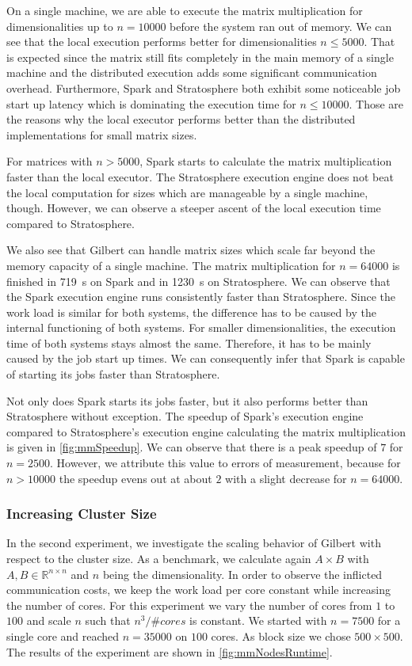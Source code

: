On a single machine, we are able to execute the matrix multiplication for dimensionalities up to $n=10000$ before the system ran out of memory.
We can see that the local execution performs better for dimensionalities $n \le 5000$.
That is expected since the matrix still fits completely in the main memory of a single machine and the distributed execution adds some significant communication overhead.
Furthermore, Spark and Stratosphere both exhibit some noticeable job start up latency which is dominating the execution time for $n\le 10000$.
Those are the reasons why the local executor performs better than the distributed implementations for small matrix sizes.

For matrices with $n>5000$, Spark starts to calculate the matrix multiplication faster than the local executor.
The Stratosphere execution engine does not beat the local computation for sizes which are manageable by a single machine, though.
However, we can observe a steeper ascent of the local execution time compared to Stratosphere.

We also see that Gilbert can handle matrix sizes which scale far beyond the memory capacity of a single machine.
The matrix multiplication for $n=64000$ is finished in \SI{719}{\second} on Spark and in \SI{1230}{\second} on Stratosphere.
We can observe that the Spark execution engine runs consistently faster than Stratosphere.
Since the work load is similar for both systems, the difference has to be caused by the internal functioning of both systems.
For smaller dimensionalities, the execution time of both systems stays almost the same.
Therefore, it has to be mainly caused by the job start up times.
We can consequently infer that Spark is capable of starting its jobs faster than Stratosphere.

Not only does Spark starts its jobs faster, but it also performs better than Stratosphere without exception.
The speedup of Spark's execution engine compared to Stratosphere's execution engine calculating the matrix multiplication is given in \cref{fig:mmSpeedup}.
We can observe that there is a peak speedup of $7$ for $n=2500$.
However, we attribute this value to errors of measurement, because for $n>10000$ the speedup evens out at about $2$ with a slight decrease for $n=64000$.

\subsubsection{Increasing Cluster Size}

In the second experiment, we investigate the scaling behavior of Gilbert with respect to the cluster size.
As a benchmark, we calculate again $A\times B$ with $A,B \in \mathbb{R}^{n\times n}$ and $n$ being the dimensionality.
In order to observe the inflicted communication costs, we keep the work load per core constant while increasing the number of cores.
For this experiment we vary the number of cores from $1$ to $100$ and scale $n$ such that $n^3/\#cores$ is constant.
We started with $n=7500$ for a single core and reached $n=35000$ on $100$ cores.
As block size we chose $500\times 500$.
The results of the experiment are shown in \cref{fig:mmNodesRuntime}.

